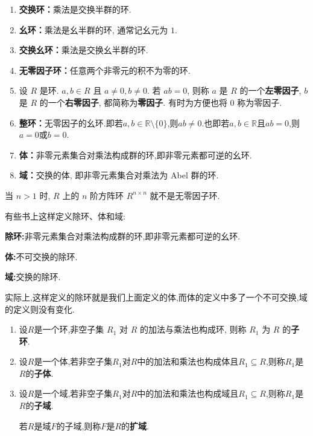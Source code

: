 \documentclass[../../main.tex]{subfiles}%
\begin{document}
\begin{definition}
\begin{enumerate}
\item \textbf{交换环：}乘法是交换半群的环.

\item \textbf{幺环：}乘法是幺半群的环, 通常记幺元为 \( 1 \).

\item \textbf{交换幺环：}乘法是交换幺半群的环.

\item \textbf{无零因子环：}任意两个非零元的积不为零的环.

\item 设 \( R \) 是环. \( a,b \in R \) 且 \( a \neq 0, b \neq 0 \). 若 \( ab = 0 \), 则称 \( a \) 是 \( R \) 的一个\textbf{左零因子}, \( b \) 是 \( R \) 的一个\textbf{右零因子}, 都简称为\textbf{零因子}. 有时为方便也将 \( 0 \) 称为零因子. 

\item \textbf{整环：}无零因子的幺环.即若$a,b\in \mathbb{R}\setminus \{0\}$,则$ab\neq 0$.也即若$a,b\in \mathbb{R}$且$ab=0$,则$a=0$或$b=0$.

\item \textbf{体：}非零元素集合对乘法构成群的环,即非零元素都可逆的幺环.

\item \textbf{域：}交换的体, 即非零元素集合对乘法为 Abel 群的环.
\end{enumerate}
\end{definition}
\begin{note}
当 \( n > 1 \) 时, \( R \) 上的 \( n \) 阶方阵环 \( R^{n \times n} \) 就不是无零因子环.
\end{note}
\begin{remark}
有些书上这样定义除环、体和域:

\textbf{除环:}非零元素集合对乘法构成群的环,即非零元素都可逆的幺环.

\textbf{体:}不可交换的除环.

\textbf{域:}交换的除环.

实际上,这样定义的除环就是我们上面定义的体,而体的定义中多了一个不可交换,域的定义则没有变化.
\end{remark}

\begin{definition}
\begin{enumerate}
\item 设$R$是一个环,非空子集 \( R_1 \) 对 \( R \) 的加法与乘法也构成环, 则称 \( R_1 \) 为 \( R \) 的\textbf{子环}.
    
\item 设$R$是一个体,若非空子集$R_1$对$R$中的加法和乘法也构成体且$R_1\subseteq R$,则称$R_1$是$R$的\textbf{子体}.

\item 设$R$是一个域,若非空子集$R_1$对$R$中的加法和乘法也构成域且$R_1\subseteq R$,则称$R_1$是$R$的\textbf{子域}.

若$R$是域$F$的子域,则称$F$是$R$的\textbf{扩域}.
\end{enumerate}
\end{definition}
\end{document}
